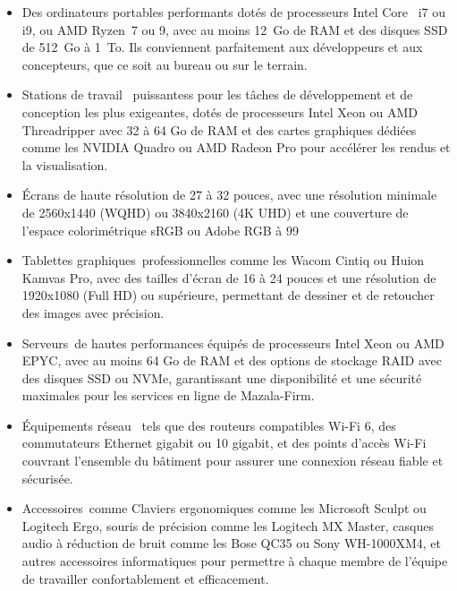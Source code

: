 \begin{itemize}
  \item Des ordinateurs portables performants dotés de processeurs Intel Core 
    i7 ou i9, ou AMD Ryzen 7 ou 9, avec au moins 12 Go de RAM et des disques
    SSD de 512 Go à 1 To. Ils conviennent parfaitement aux développeurs et aux
    concepteurs, que ce soit au bureau ou sur le terrain.

  \item Stations de travail  puissantess pour les tâches de développement et
    de conception les plus exigeantes, dotés de processeurs Intel Xeon ou AMD
    Threadripper avec 32 à 64 Go de RAM et des cartes graphiques dédiées comme
    les NVIDIA Quadro ou AMD Radeon Pro pour accélérer les rendus et la visualisation.

  \item Écrans de haute résolution de 27 à 32 pouces, avec une résolution
    minimale de 2560x1440 (WQHD) ou 3840x2160 (4K UHD) et une couverture de
    l'espace colorimétrique sRGB ou Adobe RGB à 99%

  \item Tablettes graphiques professionnelles comme les Wacom Cintiq ou
    Huion Kamvas Pro, avec des tailles d'écran de 16 à 24 pouces et une
    résolution de 1920x1080 (Full HD) ou supérieure, permettant de dessiner et
    de retoucher des images avec précision.

  \item Serveurs de hautes performances équipés de processeurs Intel Xeon ou
    AMD EPYC, avec au moins 64 Go de RAM et des options de stockage RAID avec
    des disques SSD ou NVMe, garantissant une disponibilité et une sécurité
    maximales pour les services en ligne de Mazala-Firm.

  \item Équipements réseau  tels que des routeurs compatibles Wi-Fi 6, des
    commutateurs Ethernet gigabit ou 10 gigabit, et des points d'accès Wi-Fi
    couvrant l'ensemble du bâtiment pour assurer une connexion réseau fiable et
    sécurisée.

  \item Accessoires comme  Claviers ergonomiques comme les Microsoft Sculpt ou
    Logitech Ergo, souris de précision comme les Logitech MX Master, casques
    audio à réduction de bruit comme les Bose QC35 ou Sony WH-1000XM4, et
    autres accessoires informatiques pour permettre à chaque membre de
    l’équipe de travailler confortablement et efficacement.

\end{itemize}



